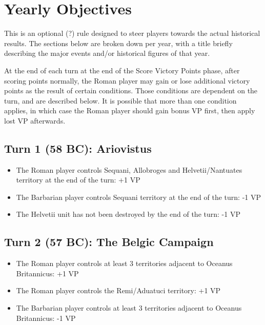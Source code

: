 \section{Yearly Objectives}
This is an optional (?) rule designed to steer players towards the actual historical results. The sections below are broken down per year, with a title briefly describing the major events and/or historical figures of that year.

At the end of each turn at the end of the Score Victory Points phase, after scoring points normally, the Roman player may gain or lose additional victory points as the result of certain conditions. Those conditions are dependent on the turn, and are described below. It is possible that more than one condition applies, in which case the Roman player should gain bonus VP first, then apply lost VP afterwards.

\subsection{Turn 1 (58 BC): Ariovistus}
\begin{itemize}
  \setlength\itemsep{0em}
  \item The Roman player controls Sequani, Allobroges and Helvetii/Nantuates territory at the end of the turn: +1 VP
  \item The Barbarian player controls Sequani territory at the end of the turn: -1 VP
  \item The Helvetii unit has not been destroyed by the end of the turn: -1 VP
\end{itemize}

\subsection{Turn 2 (57 BC): The Belgic Campaign}
\begin{itemize}
  \setlength\itemsep{0em}
  \item The Roman player controls at least 3 territories adjacent to Oceanus Britannicus: +1 VP
  \item The Roman player controls the Remi/Aduatuci territory: +1 VP
  \item The Barbarian player controls at least 3 territories adjacent to Oceanus Britannicus: -1 VP
\end{itemize}

